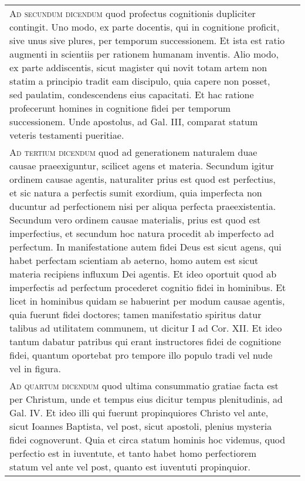 \documentclass[10pt]{jsarticle} %
\begin{document}
\begin{longtable}{p{21em}p{21em}}
\\



{\scshape Ad secundum dicendum} quod profectus
cognitionis dupliciter contingit. Uno modo, ex parte docentis, qui in
cognitione proficit, sive unus sive plures, per temporum
successionem. Et ista est ratio augmenti in scientiis per rationem
humanam inventis. Alio modo, ex parte addiscentis, sicut magister qui
novit totam artem non statim a principio tradit eam discipulo, quia
capere non posset, sed paulatim, condescendens eius capacitati. Et hac
ratione profecerunt homines in cognitione fidei per temporum
successionem. Unde apostolus, ad Gal. III, comparat statum veteris
testamenti pueritiae.

&


\\



{\scshape Ad tertium dicendum} quod ad generationem
naturalem duae causae praeexiguntur, scilicet agens et materia. Secundum
igitur ordinem causae agentis, naturaliter prius est quod est
perfectius, et sic natura a perfectis sumit exordium, quia imperfecta
non ducuntur ad perfectionem nisi per aliqua perfecta
praeexistentia. Secundum vero ordinem causae materialis, prius est quod
est imperfectius, et secundum hoc natura procedit ab imperfecto ad
perfectum. In manifestatione autem fidei Deus est sicut agens, qui habet
perfectam scientiam ab aeterno, homo autem est sicut materia recipiens
influxum Dei agentis. Et ideo oportuit quod ab imperfectis ad perfectum
procederet cognitio fidei in hominibus. Et licet in hominibus quidam se
habuerint per modum causae agentis, quia fuerunt fidei doctores; tamen
manifestatio spiritus datur talibus ad utilitatem communem, ut dicitur I
ad Cor. XII. Et ideo tantum dabatur patribus qui erant instructores
fidei de cognitione fidei, quantum oportebat pro tempore illo populo
tradi vel nude vel in figura.

&


\\



{\scshape Ad quartum dicendum} quod ultima
consummatio gratiae facta est per Christum, unde et tempus eius dicitur
tempus plenitudinis, ad Gal. IV. Et ideo illi qui fuerunt propinquiores
Christo vel ante, sicut Ioannes Baptista, vel post, sicut apostoli,
plenius mysteria fidei cognoverunt. Quia et circa statum hominis hoc
videmus, quod perfectio est in iuventute, et tanto habet homo
perfectiorem statum vel ante vel post, quanto est iuventuti propinquior.

&


\end{longtable}
\newpage
\end{document}
